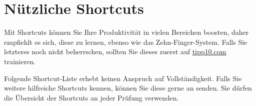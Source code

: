 \fancyhfoffset{0pt}

\chapter{Nützliche Shortcuts}\label{sec:shortcuts}\clearpage
Mit Shortcuts können Sie Ihre Produktivität in vielen Bereichen boosten, daher empfiehlt es sich, diese zu lernen, ebenso wie das Zehn-Finger-System. Falls Sie letzteres noch nicht beherrschen, sollten Sie dieses zuerst auf \href{https://www.tipp10.com/de/}{tipp10.com} trainieren.

Folgende Shortcut-Liste erhebt keinen Anspruch auf Vollständigkeit. Falls Sie weitere hilfreiche Shortcuts kennen, können Sie diese gerne an \href{mailto:\mainauthormailA}{\mainauthorA} senden. Sie dürfen die Übersicht der Shortcuts an jeder Prüfung verwenden.
